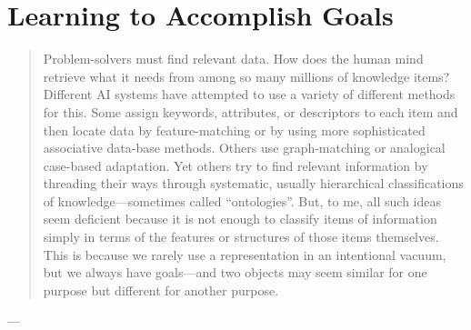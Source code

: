 \chapter{Learning to Accomplish Goals}\label{ch:learning_to_accomplish_goals}

\begin{quote}
  Problem-solvers must find relevant data.  How does the human mind
  retrieve what it needs from among so many millions of knowledge items?
  Different AI systems have attempted to use a variety of different
  methods for this.  Some assign keywords, attributes, or descriptors to
  each item and then locate data by feature-matching or by using more
  sophisticated associative data-base methods.  Others use
  graph-matching or analogical case-based adaptation.  Yet others try to
  find relevant information by threading their ways through systematic,
  usually hierarchical classifications of knowledge---sometimes called
  ``ontologies''.  But, to me, all such ideas seem deficient because it
  is not enough to classify items of information simply in terms of the
  features or structures of those items themselves.  This is because we
  rarely use a representation in an intentional vacuum, but we always
  have goals---and two objects may seem similar for one purpose but
  different for another purpose.
\end{quote}
\begin{flushright}
  --- 
\end{flushright}

%
%



